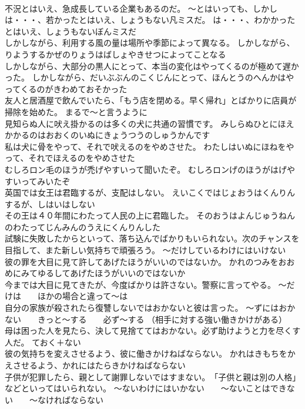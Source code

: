 \documentclass[8pt]{extreport}
\begin{document}
\begin{CJK}{UTF8}{min}
\\	不況とはいえ、急成長している企業もあるのだ。	～とはいっても、しかし
\\	は・・・、若かったとはいえ、しょうもない凡ミスだ。	は・・・、わかかったとはいえ、しょうもないぼんミスだ 
\\	しかしながら、利用する風の量は場所や季節によって異なる。	しかしながら、りようするかぜのりょうはばしょやきせつによってことなる 
\\	しかしながら、大部分の黒人にとって、本当の変化はやってくるのが極めて遅かった。	しかしながら、だいぶぶんのこくじんにとって、ほんとうのへんかはやってくるのがきわめておそかった 
\\	友人と居酒屋で飲んでいたら、「もう店を閉める。早く帰れ」とばかりに店員が掃除を始めた。	まるで～と言うように
\\	見知らぬ人に吠え掛かるのは多くの犬に共通の習慣です。	みしらぬひとにほえかかるのはおおくのいぬにきょうつうのしゅうかんです 
\\	私は犬に骨をやって、それで吠えるのをやめさせた。	わたしはいぬにほねをやって、それでほえるのをやめさせた 
\\	むしろロン毛のほうが禿げやすいって聞いたぞ。	むしろロンげのほうがはげやすいってみいたぞ 
\\	英国では女王は君臨するが、支配はしない。	えいこくではじょおうはくんりんするが、しはいはしない 
\\	その王は４０年間にわたって人民の上に君臨した。	そのおうはよんじゅうねんのわたってじんみんのうえにくんりんした 
\\	試験に失敗したからといって、落ち込んでばかりもいられない。次のチャンスを目指して、また新しい気持ちで頑張ろう。	～だけしているわけにはいけない
\\	彼の罪を大目に見て許してあげたほうがいいのではないか。	かれのつみをおおめにみてゆるしてあげたほうがいいのではないか 
\\	今までは大目に見てきたが、今度ばかりは許さない。警察に言ってやる。	～だけは　　ほかの場合と違って～は
\\	自分の家族が殺されたら復讐しないではおかないと彼は言った。	～ずにはおかない　　きっと～する　　必ず～する （相手に対する強い働きかけがある）
\\	母は困った人を見たら、決して見捨ててはおかない。必ず助けようと力を尽くす人だ。	ておく＋ない
\\	彼の気持ちを変えさせるよう、彼に働きかけねばならない。	かれはきもちをかえさせるよう、かれにはたらきかけねばならない 
\\	子供が犯罪したら、親として謝罪しないではすまない。　「子供と親は別の人格」などといってはいられない。	～ないわけにはいかない　　～ないことはできない　　～なければならない

\end{CJK}
\end{document}
